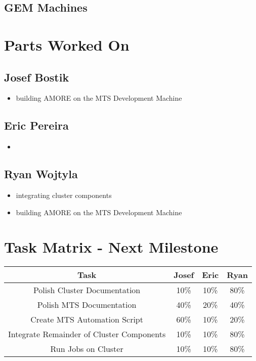 \documentclass[12pt]{article}
\newcommand\tab[1][1cm]{\hspace*{#1}}
\begin{document}
\subsection{GEM Machines}

\tab 
\section{Parts Worked On}

\subsection{Josef Bostik}

\begin{itemize}
\item building AMORE on the MTS Development Machine
\end{itemize}

\subsection{Eric Pereira}

\begin{itemize}
\item 
\end{itemize}

\subsection{Ryan Wojtyla}

\begin{itemize}
\item integrating cluster components
\item building AMORE on the MTS Development Machine
\end{itemize}

\section{Task Matrix - Next Milestone}

\begin{center}
  \begin{tabular}{|c|c|c|c|}
    \hline
    Task & Josef & Eric & Ryan \\
    \hline
    Polish Cluster Documentation & 10\% & 10\% & 80\% \\
    Polish MTS Documentation & 40\% & 20\% & 40\% \\
    Create MTS Automation Script & 60\% & 10\% & 20\% \\
    Integrate Remainder of Cluster Components & 10\% & 10\% & 80\% \\
    Run Jobs on Cluster & 10\% & 10\% & 80\% \\
    \hline
  \end{tabular}
\end{center}
\end{document}
